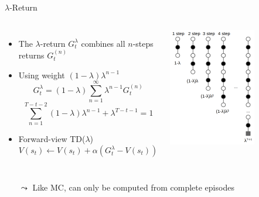 \documentclass[aspectratio=169]{../latex_main/tntbeamer}  %
\begin{document}
\begin{frame}[c]{$\lambda$-Return}
\vspace{-2em}	
\begin{columns}
	
	
	\begin{itemize}
		\item The $\lambda$-return $G_t^ {\lambda}$ combines all $n$-steps returns $G_t^{(n)}$
		\item Using weight $(1-\lambda) \lambda^{n-1}$
		$$G_t^\lambda = (1-\lambda) \sum_{n=1}^{\infty} \lambda^{n-1} G_t^{(n)} $$
		$$ \sum_{n=1}^{T-t-2} (1-\lambda) \lambda^{n-1} + \lambda^{T-t-1} = 1 $$
		\item Forward-view TD($\lambda$)
		$$V(s_t) \gets V(s_t) + \alpha \left(G_t^\lambda - V(s_t)\right) $$
	\end{itemize}



\includegraphics[width=0.65\textwidth]{images/td_lambda.png}
	
\end{columns}

\begin{itemize}
	\item[$\leadsto$] Like MC, can only be computed from complete episodes
\end{itemize}
	

	
\end{frame}
\end{document}
